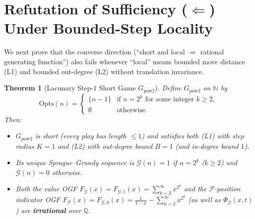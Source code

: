 \documentclass[11pt]{article}
\newtheorem{theorem}{Theorem}[section]
\theoremstyle{definition}
\theoremstyle{remark}
\newcommand{\N}{\mathbb{N}}
\newcommand{\Q}{\mathbb{Q}}
\newcommand{\G}{\mathcal{G}}
\newcommand{\Ppos}{\mathcal{P}}
\newcommand{\Opts}{\mathrm{Opts}}
\begin{document}
\section{Refutation of Sufficiency (\texorpdfstring{$\Leftarrow$}{<=}) Under Bounded-Step Locality}
\label{sec:sufficiency}

We next prove that the converse direction (``short and local $\Rightarrow$ rational generating function'') also fails whenever ``local'' means bounded move distance (L1) and bounded out-degree (L2) without translation invariance.

\begin{theorem}[Lacunary Step-$1$ Short Game $G_{\mathrm{pow2}}$]
\label{thm:lacunary}
Define $G_{\mathrm{pow2}}$ on $\N$ by
\[
  \Opts(n) = \begin{cases} \{n - 1\} & \text{if } n = 2^k \text{ for some integer } k \ge 2, \\ \emptyset & \text{otherwise.} \end{cases}
\]
Then:
\begin{itemize}
  \item[\textup{(i)}] $G_{\mathrm{pow2}}$ is short (every play has length $\le 1$) and satisfies both \textup{(L1)} with step radius $K = 1$ and \textup{(L2)} with out-degree bound $B = 1$ (and in-degree bound $1$).
  \item[\textup{(ii)}] Its unique Sprague--Grundy sequence is $\G(n) = 1$ if $n = 2^k$ ($k \ge 2$) and $\G(n) = 0$ otherwise.
  \item[\textup{(iii)}] Both the value OGF $F_{\G}(x) = F_{\G,1}(x) = \sum_{k=2}^{\infty} x^{2^k}$ and the $\Ppos$-position indicator OGF $F_{\Ppos}(x) = F_{\G,0}(x) = \frac{1}{1-x} - \sum_{k=2}^{\infty} x^{2^k}$ (as well as $\Phi_{\G}(x,t)$) are \textbf{irrational} over $\Q$.
\end{itemize}
\end{theorem}
\end{document}
